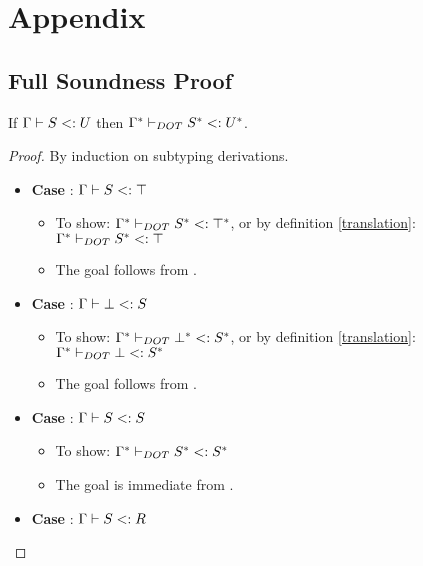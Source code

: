\appendix

\section{Appendix}

\subsection*{Full Soundness Proof}

\begin{LEMMA}
    \label{pres_subtyping}
    If $\Gamma \vdash S <: U$ then $\Gamma^{*} \vdash_{DOT} S^{*} <: U^{*}$.
\end{LEMMA}

\begin{proof}
    By induction on subtyping derivations.
    \begin{itemize}
        \item \textbf{Case} : $\Gamma \vdash S <: \top$
        \begin{itemize}
            \item To show: $\Gamma^{*} \vdash_{DOT} S^{*} <: \top^{*}$, or
                by definition \ref{translation}:
                $\Gamma^{*} \vdash_{DOT} S^{*} <: \top$
            \item The goal follows from .
        \end{itemize}
        \item \textbf{Case} : $\Gamma \vdash \bot <: S$
        \begin{itemize}
            \item To show: $\Gamma^{*} \vdash_{DOT} \bot^{*} <: S^{*}$, or
                by definition \ref{translation}:
                $\Gamma^{*} \vdash_{DOT} \bot <: S^{*}$
            \item The goal follows from .
        \end{itemize}
        \item \textbf{Case} : $\Gamma \vdash S <: S$
        \begin{itemize}
            \item To show: $\Gamma^{*} \vdash_{DOT} S^{*} <: S^{*}$
            \item The goal is immediate from .
        \end{itemize}
        \item \textbf{Case} : $\Gamma \vdash S <: R$
        \begin{itemize}

\end{itemize}
\end{itemize}
\end{proof}
